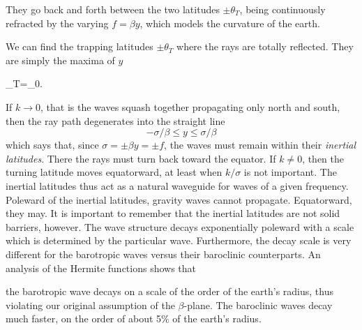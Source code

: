 \sourcepagebreak


They go back and forth between the two latitudes $\pm\theta_T$, being continuously
refracted by the varying $f=\beta y$, which models the curvature of the earth.

We can find the trapping latitudes $\pm\theta_T$ where the rays are totally reflected. They
are simply the maxima of $y$
\begin{waveequation}
	\pm\theta_T=\pm{}\tan\theta_0.
\end{waveequation}

If $k\to0$, that is the waves squash together propagating only north and south, then
the ray path degenerates into the straight line
\[
	-\sigma/\beta\le y\le\sigma/\beta
\]
which says that, since $\sigma=\pm\beta y=\pm f$, the waves must remain within their
\emph{inertial latitudes}. There the rays must turn back toward the equator. If
$k\ne0$, then the turning latitude moves equatorward, at least when $k/\sigma$ is not
important. The inertial latitudes thus act as a natural waveguide for waves of a given
frequency. Poleward of the inertial latitudes, gravity waves cannot propagate.
Equatorward, they may. It is important to remember that the inertial latitudes are not
solid barriers, however. The wave structure decays exponentially poleward with a scale
which is determined by the particular wave. Furthermore, the decay scale is very
different for the barotropic waves versus their baroclinic counterparts. An analysis of
the Hermite functions shows that

\sourcepagebreak

the barotropic wave decays on a scale of the order of the earth's radius, thus violating
our original assumption of the $\beta$-plane. The baroclinic waves decay much faster,
on the order of about 5\% of the earth's radius.
